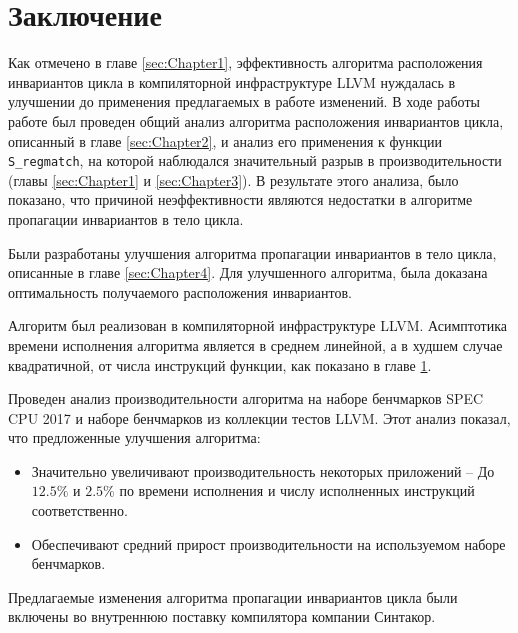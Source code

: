 \chapter{Заключение}
\label{sec:Chapter5} 

Как отмечено в главе \ref{sec:Chapter1}, эффективность алгоритма расположения инвариантов цикла в компиляторной инфраструктуре LLVM нуждалась в улучшении до применения предлагаемых в работе изменений.
В ходе работы работе был проведен общий анализ алгоритма расположения инвариантов цикла, описанный в главе \ref{sec:Chapter2}, и анализ его применения к функции \texttt{S\_regmatch}, на которой наблюдался значительный разрыв в производительности (главы \ref{sec:Chapter1} и \ref{sec:Chapter3}).
В результате этого анализа, было показано, что причиной неэффективности являются недостатки в алгоритме пропагации инвариантов в тело цикла.

Были разработаны улучшения алгоритма пропагации инвариантов в тело цикла, описанные в главе \ref{sec:Chapter4}.
Для улучшенного алгоритма, была доказана оптимальность получаемого расположения инвариантов.

Алгоритм был реализован в компиляторной инфраструктуре LLVM.
Асимптотика времени исполнения алгоритма является в среднем линейной, а в худшем случае квадратичной, от числа инструкций функции, как показано в главе \ref{sec:Chapter5}.

Проведен анализ производительности алгоритма на наборе бенчмарков SPEC CPU\textsuperscript{\tiny\textregistered} 2017 и наборе бенчмарков из коллекции тестов LLVM.
Этот анализ показал, что предложенные улучшения алгоритма:
\begin{itemize}
    \item Значительно увеличивают производительность некоторых приложений --
        До $12.5\%$ и $2.5\%$ по времени исполнения и числу исполненных инструкций соответственно.
    \item Обеспечивают средний прирост производительности на используемом наборе бенчмарков.
\end{itemize}

Предлагаемые изменения алгоритма пропагации инвариантов цикла были включены во внутреннюю поставку компилятора компании Синтакор.

\newpage
